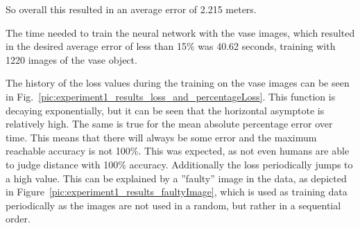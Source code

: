 So overall this resulted in an average error of 2.215 meters.

The time needed to train the neural network with the vase images, which resulted in the desired average error of less than 15\% was 40.62 seconds, training with 1220 images of the vase object.

The history of the loss values during the training on the vase images can be seen in Fig.~\ref{pic:experiment1_results_loss_and_percentageLoss}. This function is decaying exponentially, but it can be seen that the horizontal asymptote is relatively high. The same is true for the mean absolute percentage error over time. This means that there will always be some error and the maximum reachable accuracy is not 100\%. This was expected, as not even humans are able to judge distance with 100\% accuracy. Additionally the loss periodically jumps to a high value. This can be explained by a ''faulty'' image in the data, as depicted in Figure~\ref{pic:experiment1_results_faultyImage}, which is used as training data periodically as the images are not used in a random, but rather in a sequential order.

